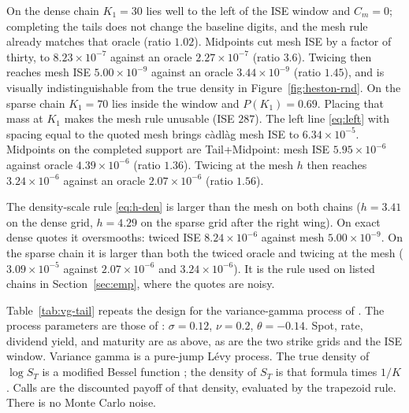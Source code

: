 \documentclass[preprint,12pt,authoryear,times]{elsarticle}
\begin{document}
On the dense chain \(K_1=30\) lies well to the left of the ISE window and \(C_m=0\); completing the tails does not change the baseline digits, and the mesh rule already matches that oracle (ratio \(1.02\)). Midpoints cut mesh ISE by a factor of thirty, to \(8.23\times 10^{-7}\) against an oracle \(2.27\times 10^{-7}\) (ratio \(3.6\)). Twicing then reaches mesh ISE \(5.00\times 10^{-9}\) against an oracle \(3.44\times 10^{-9}\) (ratio \(1.45\)), and is visually indistinguishable from the true density in Figure~\ref{fig:heston-rnd}. On the sparse chain \(K_1=70\) lies inside the window and \(P(K_1)=0.69\). Placing that mass at \(K_1\) makes the mesh rule unusable (ISE \(287\)). The left line \eqref{eq:left} with spacing equal to the quoted mesh brings c\`adl\`ag mesh ISE to \(6.34\times 10^{-5}\). Midpoints on the completed support are Tail+Midpoint: mesh ISE \(5.95\times 10^{-6}\) against oracle \(4.39\times 10^{-6}\) (ratio \(1.36\)). Twicing at the mesh \(h\) then reaches \(3.24\times 10^{-6}\) against an oracle \(2.07\times 10^{-6}\) (ratio \(1.56\)).

The density-scale rule \eqref{eq:h-den} is larger than the mesh on both chains (\(h=3.41\) on the dense grid, \(h=4.29\) on the sparse grid after the right wing). On exact dense quotes it oversmooths: twiced ISE \(8.24\times 10^{-6}\) against mesh \(5.00\times 10^{-9}\). On the sparse chain it is larger than both the twiced oracle and twicing at the mesh (\(3.09\times 10^{-5}\) against \(2.07\times 10^{-6}\) and \(3.24\times 10^{-6}\)). It is the rule used on listed chains in Section~\ref{sec:emp}, where the quotes are noisy.

Table~\ref{tab:vg-tail} repeats the design for the variance-gamma process of \citet{madan1998}. The process parameters are those of \citet{carrmadan1999}: \(\sigma=0.12\), \(\nu=0.2\), \(\theta=-0.14\). Spot, rate, dividend yield, and maturity are as above, as are the two strike grids and the ISE window. Variance gamma is a pure-jump L\'evy process. The true density of \(\log S_T\) is a modified Bessel function \citep{madan1998}; the density of \(S_T\) is that formula times \(1/K\). Calls are the discounted payoff of that density, evaluated by the trapezoid rule. There is no Monte Carlo noise.
\end{document}
